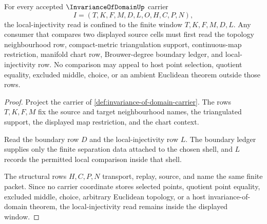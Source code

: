 \begin{theorem}
\label{thm:invariance-of-domain-local-injectivity-window}
For every accepted $\InvarianceOfDomainUp$ carrier
$$
I=(T,K,F,M,D,L,O,H,C,P,N),
$$
the local-injectivity read is confined to the finite window $T,K,F,M,D,L$. Any consumer that compares two displayed source cells must first read the topology neighbourhood row, compact-metric triangulation support, continuous-map restriction, manifold chart row, Brouwer-degree boundary ledger, and local-injectivity row. No comparison may appeal to host point selection, quotient equality, excluded middle, choice, or an ambient Euclidean theorem outside those rows.
\end{theorem}
\begin{proof}
Project the carrier of \autoref{def:invariance-of-domain-carrier}. The rows $T,K,F,M$ fix the source and target neighbourhood names, the triangulated support, the displayed map restriction, and the chart context.

Read the boundary row $D$ and the local-injectivity row $L$. The boundary ledger supplies only the finite separation data attached to the chosen shell, and $L$ records the permitted local comparison inside that shell.

The structural rows $H,C,P,N$ transport, replay, source, and name the same finite packet. Since no carrier coordinate stores selected points, quotient point equality, excluded middle, choice, arbitrary Euclidean topology, or a host invariance-of-domain theorem, the local-injectivity read remains inside the displayed window.
\end{proof}

